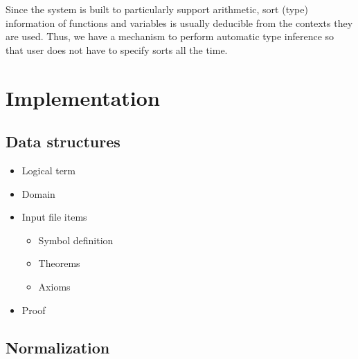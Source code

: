 \documentclass[12pt]{article}
\begin{document}
Since the system is built to particularly support arithmetic, sort (type) information of functions and variables is usually deducible from the contexts they are used. Thus, we have a mechanism to perform automatic type inference so that user does not have to specify sorts all the time.

\section{Implementation}

\subsection{Data structures}

\begin{itemize}
\item Logical term
\item Domain
\item Input file items
\begin{itemize}
\item Symbol definition
\item Theorems
\item Axioms
\end{itemize}
\item Proof
\end{itemize}

\subsection{Normalization}


\end{document}

